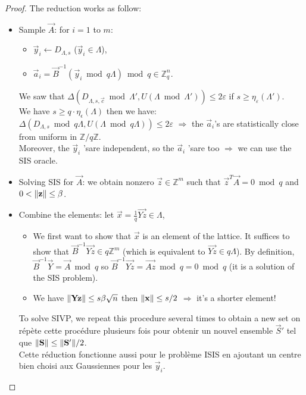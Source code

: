 \begin{proof}
The reduction works as follow:
\begin{itemize}
\item Sample $\vec{A}$: for $i=1$ to $m$:
\begin{itemize}
\item $\vec{y}_i \leftarrow D_{\Lambda,s}$ ($\vec{y}_i \in \Lambda$),
\item $\vec{a}_i = \vec{B}^{-1} (\vec{y}_i \bmod q \Lambda) \bmod q \in \mathbb{Z}_q^n$. 
\end{itemize}
We saw that $ \Delta(D_{\Lambda,s,\vec{c}} \bmod \Lambda', U(\Lambda \bmod \Lambda')) \leq 2 \varepsilon$ if $s \geq \eta_{\varepsilon}(\Lambda')$. \\ We have $s \geq q \cdot \eta_{\epsilon}(\Lambda)$ then we have: $ \Delta(D_{\Lambda,s} \bmod q \Lambda, U(\Lambda \bmod q\Lambda)) \leq 2 \varepsilon$ $\Rightarrow$ the $\vec{a}_i$'s are statistically close from uniform in $\mathbb{Z}/ q \mathbb{Z}$. \\
Moreover, the $\vec{y}_i$ 'sare independent, so the $\vec{a}_i$ 'sare too $\Rightarrow$ we can use the SIS oracle.
\item Solving SIS for $\vec{A}$: we obtain nonzero $\vec{z} \in \mathbb{Z}^m$ such that $\vec{z}^T \vec{A} = 0 \bmod q$ and $ 0 < \Vert \mathbf{z} \Vert \leq \beta$.
\item Combine the elements: let $\vec{x} = \frac{1}{q}\vec{Yz} \in \Lambda$,
\begin{itemize}
\item We first want to show that $\vec{x}$ is an element of the lattice. It suffices to show that $\vec{B}^{-1} \vec{Yz} \in q \mathbb{Z}^m$ (which is equivalent to $\vec{Yz} \in q \Lambda$).  By definition, $\vec{B}^{-1} \vec{Y} = \vec{A} \bmod q$ so $\vec{B}^{-1} \vec{Yz} = \vec{Az} \bmod q = 0 \bmod q$ (it is a solution of the SIS problem).
\item  We have $\Vert \mathbf{Yz} \Vert  \leq s \beta \sqrt{n}$ then $\Vert \mathbf{x} \Vert \leq s/2$ $\Rightarrow$ it's a shorter element!
\end{itemize}
To solve SIVP, we repeat this procedure several times to obtain a new set on répète cette procédure plusieurs fois pour obtenir un nouvel ensemble $\vec{S}'$ tel que $\Vert \mathbf{S} \Vert \leq \Vert \mathbf{S}' \Vert / 2$. \\
Cette réduction fonctionne aussi pour le problème ISIS en ajoutant un centre bien choisi aux Gaussiennes pour les $\vec{y}_i$.
\end{itemize}
\end{proof}



